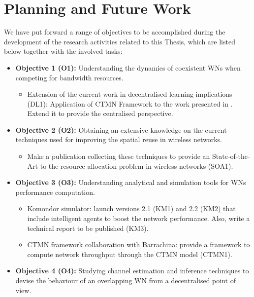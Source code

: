 \documentclass[12pt, a4paper,twoside]{tesi_upf}
\begin{document}
	\chapter{Planning and Future Work}
	\label{section:future_work}

		We have put forward a range of objectives to be accomplished during the development of the research activities related to this Thesis, which are listed below together with the involved tasks:
		\begin{itemize}
			\item \textbf{Objective 1 (O1):} Understanding the dynamics of coexistent WNs when competing for bandwidth resources.
			\begin{itemize}
				\item Extension of the current work in decentralised learning implications (DL1): Application of CTMN Framework to the work presented in \cite{wilhelmi2017implications}. Extend it to provide the centralised perspective.
			\end{itemize}
			\item \textbf{Objective 2 (O2):} Obtaining an extensive knowledge on the current techniques used for improving the spatial reuse in wireless networks.
			\begin{itemize}
				\item Make a publication collecting these techniques to provide an State-of-the-Art to the resource allocation problem in wireless networks (SOA1).
			\end{itemize}
			\item \textbf{Objective 3 (O3):} Understanding analytical and simulation tools for WNs performance computation.
			\begin{itemize}
				\item Komondor simulator: launch versions 2.1 (KM1) and 2.2 (KM2) that include intelligent agents to boost the network performance. Also, write a technical report to be published (KM3).
				\item CTMN framework collaboration with Barrachina: provide a framework to compute network throughput through the CTMN model (CTMN1).
			\end{itemize}
			\item \textbf{Objective 4 (O4):} Studying channel estimation and inference techniques to devise the behaviour of an overlapping WN from a decentralised point of view.
			\begin{itemize}

\end{itemize}
\end{itemize}
\end{document}

